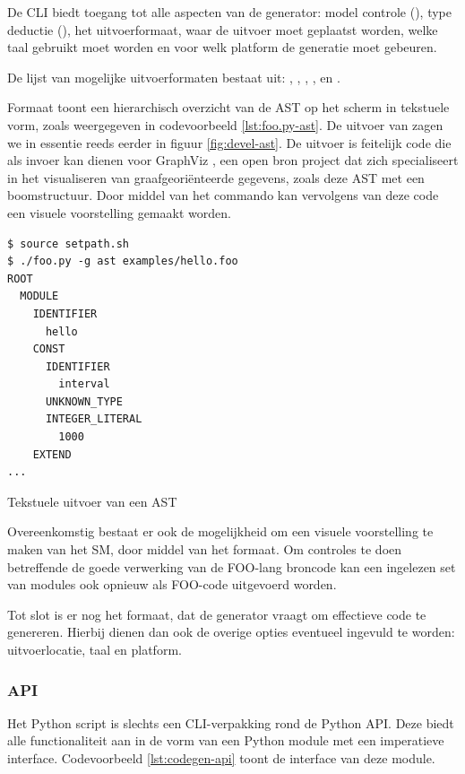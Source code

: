 De CLI biedt toegang tot alle aspecten van de generator: model controle
(), type deductie (), het uitvoerformaat, waar de uitvoer
moet geplaatst worden, welke taal gebruikt moet worden en voor welk platform de
generatie moet gebeuren.

De lijst van mogelijke uitvoerformaten bestaat uit: , ,
, ,  en .

Formaat  toont een hierarchisch overzicht van de AST op het scherm in
tekstuele vorm, zoals weergegeven in codevoorbeeld \ref{lst:foo.py-ast}. De
uitvoer van  zagen we in essentie reeds eerder in figuur
\ref{fig:devel-ast}. De uitvoer is feitelijk code die als invoer kan dienen
voor GraphViz \citep{url:graphviz}, een open bron project dat zich
specialiseert in het visualiseren van graafgeori\"enteerde gegevens, zoals deze
AST met een boomstructuur. Door middel van het  commando kan
vervolgens van deze code een visuele voorstelling gemaakt worden.

\begin{listing}[ht]
  \begin{verbatim}
$ source setpath.sh
$ ./foo.py -g ast examples/hello.foo 
ROOT
  MODULE
    IDENTIFIER
      hello
    CONST
      IDENTIFIER
        interval
      UNKNOWN_TYPE
      INTEGER_LITERAL
        1000
    EXTEND
...
  \end{verbatim}
  \vspace{-5mm}
  \caption{Tekstuele uitvoer van een AST}
  \label{lst:foo.py-ast}
\end{listing}

Overeenkomstig bestaat er ook de mogelijkheid om een visuele voorstelling te
maken van het SM, door middel van het  formaat. Om controles te
doen betreffende de goede verwerking van de FOO-lang broncode kan een ingelezen
set van modules ook opnieuw als FOO-code uitgevoerd worden.

Tot slot is er nog het  formaat, dat de generator vraagt om
effectieve code te genereren. Hierbij dienen dan ook de overige opties
eventueel ingevuld te worden: uitvoerlocatie, taal en platform.

\subsubsection{API}

Het  Python script is slechts een CLI-verpakking rond de Python
API. Deze biedt alle functionaliteit aan in de vorm van een Python module met
een imperatieve interface. Codevoorbeeld \ref{lst:codegen-api} toont de interface
van deze module.

